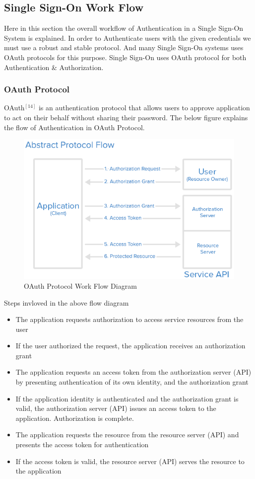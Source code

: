 \documentclass[12pt]{report}
\begin{document}
\subsection{Single Sign-On Work Flow}
Here in this section the overall workflow of Authentication in a Single Sign-On System is explained. In order to Authenticate users with the given credentials we must use a robust and stable protocol. And many Single Sign-On systems uses OAuth protocols for this purpose. Single Sign-On uses OAuth protocol for both Authentication \& Authorization.
\subsubsection{OAuth Protocol}
OAuth$ ^{[14]}$ is an authentication protocol that allows users to approve application to act on their behalf without sharing their password.
The below figure explains the flow of Authentication in OAuth Protocol.
\begin{figure}[H]
\begin{center}
\includegraphics[scale=0.5]{abstract_flow}
\caption{OAuth Protocol Work Flow Diagram\label{fig:OAuth Protocol Work Flow Diagram}}
\end{center}
\end{figure}
Steps invloved in the above flow diagram
\begin{itemize}
\item The application requests authorization to access service resources from the user
\item If the user authorized the request, the application receives an authorization grant
\item The application requests an access token from the authorization server (API) by presenting authentication of its own identity, and the authorization grant
\item If the application identity is authenticated and the authorization grant is valid, the authorization server (API) issues an access token to the application. Authorization is complete.
\item The application requests the resource from the resource server (API) and presents the access token for authentication
\item If the access token is valid, the resource server (API) serves the resource to the application

\end{itemize}
\newpage
\end{document}

